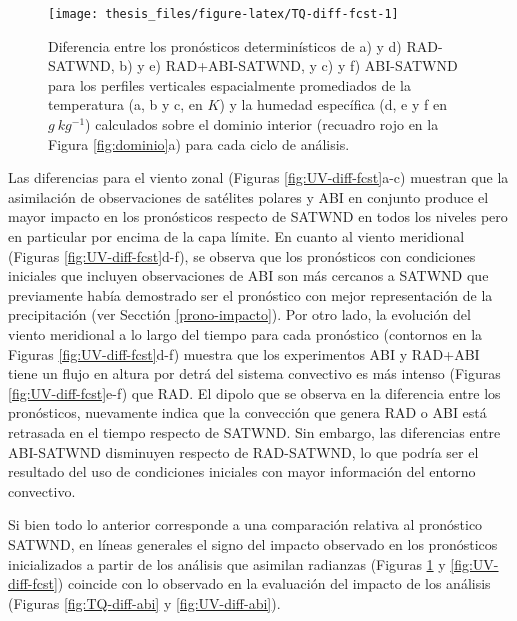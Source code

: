 \documentclass[12pt,oneside,a4paper]{reedthesis}
\begin{document}
\begin{figure}

\texttt{[image: thesis\_files/figure-latex/TQ-diff-fcst-1]} \hfill{}

\caption{Diferencia entre los pronósticos determinísticos de a) y d) RAD-SATWND, b) y e) RAD+ABI-SATWND, y c) y f) ABI-SATWND para los perfiles verticales espacialmente promediados de la temperatura (a, b y c, en \(K\)) y la humedad específica (d, e y f en \(g\ kg^{-1}\)) calculados sobre el dominio interior (recuadro rojo en la Figura \ref{fig:dominio}a) para cada ciclo de análisis.}\label{fig:TQ-diff-fcst}
\end{figure}
Las diferencias para el viento zonal (Figuras \ref{fig:UV-diff-fcst}a-c) muestran que la asimilación de observaciones de satélites polares y ABI en conjunto produce el mayor impacto en los pronósticos respecto de SATWND en todos los niveles pero en particular por encima de la capa límite. En cuanto al viento meridional (Figuras \ref{fig:UV-diff-fcst}d-f), se observa que los pronósticos con condiciones iniciales que incluyen observaciones de ABI son más cercanos a SATWND que previamente había demostrado ser el pronóstico con mejor representación de la precipitación (ver Secctión \ref{prono-impacto}). Por otro lado, la evolución del viento meridional a lo largo del tiempo para cada pronóstico (contornos en la Figuras \ref{fig:UV-diff-fcst}d-f) muestra que los experimentos ABI y RAD+ABI tiene un flujo en altura por detrá del sistema convectivo es más intenso (Figuras \ref{fig:UV-diff-fcst}e-f) que RAD. El dipolo que se observa en la diferencia entre los pronósticos, nuevamente indica que la convección que genera RAD o ABI está retrasada en el tiempo respecto de SATWND. Sin embargo, las diferencias entre ABI-SATWND disminuyen respecto de RAD-SATWND, lo que podría ser el resultado del uso de condiciones iniciales con mayor información del entorno convectivo.

Si bien todo lo anterior corresponde a una comparación relativa al pronóstico SATWND, en líneas generales el signo del impacto observado en los pronósticos inicializados a partir de los análisis que asimilan radianzas (Figuras \ref{fig:TQ-diff-fcst} y \ref{fig:UV-diff-fcst}) coincide con lo observado en la evaluación del impacto de los análisis (Figuras \ref{fig:TQ-diff-abi} y \ref{fig:UV-diff-abi}).
\end{document}
